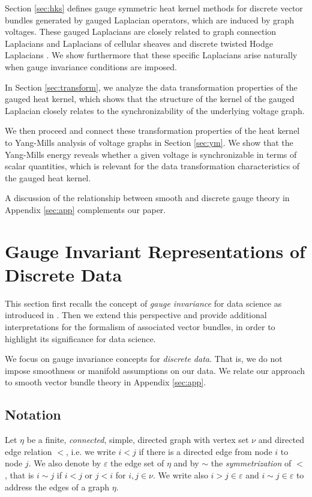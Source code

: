 \documentclass[10pt,reqno]{amsart}
\numberwithin{equation}{section}
\theoremstyle{bfnote}
\theoremstyle{bfdef}
\newcommand{\veps}{\varepsilon}
\begin{document}
	Section \ref{sec:hks} defines gauge symmetric heat kernel methods for discrete vector bundles generated by gauged Laplacian operators, which are induced by graph voltages. These gauged Laplacians are closely related to graph connection Laplacians \cite{Singer:2012aa} and Laplacians of cellular sheaves \cite{hansenSpectralTheoryCellular2019a} and discrete twisted Hodge Laplacians \cite{gaoGeometrySynchronizationProblems2019}.
	We show furthermore that these specific Laplacians arise naturally when gauge invariance conditions are imposed.

	In Section \ref{sec:transform}, we analyze the data transformation properties of the gauged heat kernel, which shows that the structure of the kernel of the gauged Laplacian  closely relates to the synchronizability of the underlying voltage graph.

	We then proceed and connect these transformation properties of the heat kernel to Yang-Mills analysis of voltage graphs in Section \ref{sec:ym}. We show that the Yang-Mills energy reveals whether a given voltage is synchronizable in terms of scalar quantities, which is relevant for the data transformation characteristics of the gauged heat kernel.

	A discussion of the relationship between smooth and discrete gauge theory in Appendix \ref{sec:app} complements our paper.

\section{Gauge Invariant Representations of Discrete Data}\label{sec:bundles}
	This section first recalls the concept of \textit{gauge invariance} for data science as introduced in \cite{batardHeatEquationsVector2011,weilerCoordinateIndependentConvolutional2021,gerkenGeometricDeepLearning2021}. Then we extend this perspective and provide additional interpretations for the formalism of associated vector bundles, in order to highlight its significance for data science.

	We focus on gauge invariance concepts for \textit{discrete data}. That is, we do not impose smoothness or manifold assumptions on our data. We relate our approach to smooth vector bundle theory in Appendix \ref{sec:app}.

\subsection{Notation}
	
	Let $\eta$ be a finite, \textit{connected}, simple, directed graph with vertex set $\nu$ and directed edge relation $<$, i.e. we write $i < j$ if there is a directed edge from node $i$ to node $j$. We also denote by $\veps$ the edge set of $\eta$ and by $\sim$ the \textit{symmetrization} of $<$, that is $i \sim j$ if $i < j$ or $j < i$ for $i,j \in \nu$. We write also $i>j \in \veps$ and $i\sim j \in \veps$ to address the edges of a graph $\eta$.
\end{document}
